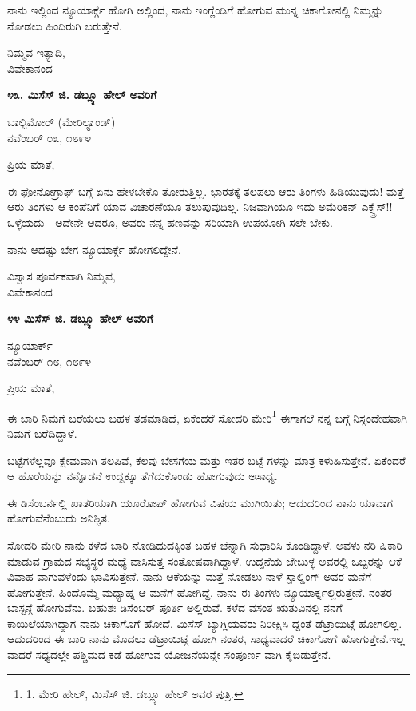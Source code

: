 ನಾನು ಇಲ್ಲಿಂದ ನ್ಯೂಯಾರ್ಕ್ಗೆ ಹೋಗಿ ಅಲ್ಲಿಂದ, ನಾನು ಇಂಗ್ಲೆಂಡಿಗೆ ಹೋಗುವ ಮುನ್ನ ಚಿಕಾಗೋನಲ್ಲಿ ನಿಮ್ಮನ್ನು ನೋಡಲು ಹಿಂದಿರುಗಿ ಬರುತ್ತೇನೆ.

\begin{flushright}
ನಿಮ್ಮವ ಇತ್ಯಾದಿ,\\ವಿವೇಕಾನಂದ
\end{flushright}

\begin{center}
\textbf{೪೩. ಮಿಸೆಸ್ ಜಿ. ಡಬ್ಲ್ಯೂ ಹೇಲ್ ಅವರಿಗೆ}
\end{center}

\begin{flushright}
ಬಾಲ್ಟಿಮೋರ್ (ಮೇರಿಲ್ಯಾಂಡ್)\\ನವೆಂಬರ್ ೦೩, ೧೮೯೪
\end{flushright}

ಪ್ರಿಯ ಮಾತೆ,

ಈ ಫೋನೋಗ್ರಾಫ್ ಬಗ್ಗೆ ಏನು ಹೇಳಬೇಕೊ ತೋರುತ್ತಿಲ್ಲ. ಭಾರತಕ್ಕೆ ತಲಪಲು ಆರು ತಿಂಗಳು ಹಿಡಿಯುವುದು! ಮತ್ತೆ ಆರು ತಿಂಗಳು ಆ ಕಂಪೆನಿಗೆ ಯಾವ ವಿಚಾರಣೆಯೂ ತಲುಪುವುದಿಲ್ಲ. ನಿಜವಾಗಿಯೂ ಇದು ಅಮೆರಿಕನ್ ಎಕ್ಸ್ಪ್ರೆಸ್!! ಒಳ್ಳೆಯದು - ಅದೇನೇ ಆದರೂ, ಅವರು ನನ್ನ ಹಣವನ್ನು ಸರಿಯಾಗಿ ಉಪಯೋಗಿ ಸಲೇ ಬೇಕು.

ನಾನು ಆದಷ್ಟು ಬೇಗ ನ್ಯೂಯಾರ್ಕ್ಗೆ ಹೋಗಲಿದ್ದೇನೆ.

\begin{flushright}
ವಿಶ್ವಾಸ ಪೂರ್ವಕವಾಗಿ ನಿಮ್ಮವ,\\ವಿವೇಕಾನಂದ
\end{flushright}

\begin{center}
\textbf{೪೪ ಮಿಸೆಸ್ ಜಿ. ಡಬ್ಲ್ಯೂ ಹೇಲ್ ಅವರಿಗೆ}
\end{center}

\begin{flushright}
ನ್ಯೂಯಾರ್ಕ್\\ನವೆಂಬರ್ ೧೮, ೧೮೯೪
\end{flushright}

ಪ್ರಿಯ ಮಾತೆ,

ಈ ಬಾರಿ ನಿಮಗೆ ಬರೆಯಲು ಬಹಳ ತಡಮಾಡಿದೆ, ಏಕೆಂದರೆ ಸೋದರಿ ಮೇರಿ\footnote{1. ಮೇರಿ ಹೇಲ್, ಮಿಸೆಸ್ ಜಿ. ಡಬ್ಲ್ಯೂ ಹೇಲ್ ಅವರ ಪುತ್ರಿ.} ಈಗಾಗಲೆ ನನ್ನ ಬಗ್ಗೆ ನಿಸ್ಸಂದೇಹವಾಗಿ ನಿಮಗೆ ಬರೆದಿದ್ದಾಳೆ.

ಬಟ್ಟೆಗಳೆಲ್ಲವೂ ಕ್ಷೇಮವಾಗಿ ತಲಪಿವೆ, ಕೆಲವು ಬೇಸಗೆಯ ಮತ್ತು ಇತರ ಬಟ್ಟೆ ಗಳನ್ನು ಮಾತ್ರ ಕಳುಹಿಸುತ್ತೇನೆ. ಏಕೆಂದರೆ ಆ ಹೊರೆಯನ್ನು ನನ್ನೊಡನೆ ಉದ್ದಕ್ಕೂ ತೆಗೆದುಕೊಂಡು ಹೋಗುವುದು ಅಸಾಧ್ಯ.

ಈ ಡಿಸೆಂಬರ್ನಲ್ಲಿ ಖಾತರಿಯಾಗಿ ಯೂರೋಪ್ ಹೋಗುವ ವಿಷಯ ಮುಗಿಯಿತು; ಆದುದರಿಂದ ನಾನು ಯಾವಾಗ ಹೋಗುವೆನೆಂಬುದು ಅನಿಶ್ಚಿತ.

ಸೋದರಿ ಮೇರಿ ನಾನು ಕಳೆದ ಬಾರಿ ನೋಡಿದುದಕ್ಕಿಂತ ಬಹಳ ಚೆನ್ನಾಗಿ ಸುಧಾರಿಸಿ ಕೊಂಡಿದ್ದಾಳೆ. ಅವಳು ನರಿ ಷಿಕಾರಿ ಮಾಡುವ ಗ್ರಾಮದ ಸಭ್ಯಸ್ಥರ ಮಧ್ಯೆ ವಾಸಿಸುತ್ತ ಸಂತೋಷವಾಗಿದ್ದಾಳೆ. ಉದ್ದನೆಯ ಜೇಬುಳ್ಳ ಅವರಲ್ಲಿ ಒಬ್ಬರನ್ನು ಆಕೆ ವಿವಾಹ ವಾಗುವಳೆಂದು ಭಾವಿಸುತ್ತೇನೆ. ನಾನು ಆಕೆಯನ್ನು ಮತ್ತೆ ನೋಡಲು ನಾಳೆ ಸ್ಪಾಲ್ಡಿಂಗ್ ಅವರ ಮನೆಗೆ ಹೋಗುತ್ತೇನೆ. ಹಿಂದೊಮ್ಮೆ ಮಧ್ಯಾಹ್ನ ಆ ಮನೆಗೆ ಹೋಗಿದ್ದೆ. ನಾನು ಈ ತಿಂಗಳು ನ್ಯೂಯಾರ್ಕ್ನಲ್ಲಿರುತ್ತೇನೆ. ನಂತರ ಬಾಸ್ಟನ್ಗೆ ಹೋಗುವೆನು. ಬಹುಶಃ ಡಿಸೆಂಬರ್ ಪೂರ್ತಿ ಅಲ್ಲಿರುವೆ. ಕಳೆದ ವಸಂತ ಋತುವಿನಲ್ಲಿ ನನಗೆ ಕಾಯಿಲೆಯಾಗಿದ್ದಾಗ ನಾನು ಚಿಕಾಗೊಗೆ ಹೋದೆ, ಮಿಸೆಸ್ ಬ್ಯಾಗ್ಲಿಯವರು ನಿರೀಕ್ಷಿಸಿ ದ್ದಂತೆ ಡೆಟ್ರಾಯಿಟ್ಗೆ ಹೋಗಲಿಲ್ಲ. ಆದುದರಿಂದ ಈ ಬಾರಿ ನಾನು ಮೊದಲು ಡೆಟ್ರಾಯಿಟ್ಗೆ ಹೋಗಿ ನಂತರ, ಸಾಧ್ಯವಾದರೆ ಚಿಕಾಗೋಗೆ ಹೋಗುತ್ತೇನೆ.ಇಲ್ಲ ವಾದರೆ ಸಧ್ಯದಲ್ಲೇ ಪಶ್ಚಿಮದ ಕಡೆ ಹೋಗುವ ಯೋಜನೆಯನ್ನೇ ಸಂಪೂರ್ಣ ವಾಗಿ ಕೈಬಿಡುತ್ತೇನೆ.

